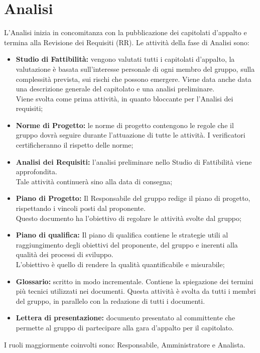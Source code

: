 \section{Analisi}
L'Analisi inizia in concomitanza con la pubblicazione dei capitolati d’appalto e termina alla Revisione dei Requisiti (RR).
Le attività della fase di Analisi sono:
\begin{itemize}
    \item \textbf{Studio di Fattibilità:} vengono valutati tutti i capitolati d'appalto, la valutazione è basata sull'interesse personale di ogni membro del gruppo, sulla complessità prevista, sui rischi che possono emergere. Viene data anche data una descrizione generale del capitolato e una analisi preliminare.\\Viene svolta come prima attività, in quanto bloccante per l'Analisi dei requisiti;
    \item \textbf{Norme di Progetto:} le norme di progetto contengono le regole che il gruppo dovrà seguire durante l'attuazione di tutte le attività. I verificatori certificheranno il rispetto delle norme;
    \item \textbf{Analisi dei Requisiti:} l'analisi preliminare nello Studio di Fattibilità viene approfondita.\\Tale attività continuerà sino alla data di consegna;
    \item \textbf{Piano di Progetto:} Il Responsabile del gruppo redige il piano di progetto, rispettando i vincoli posti dal proponente.\\Questo documento ha l'obiettivo di regolare le attività svolte dal gruppo;
    \item \textbf{Piano di qualifica:} Il piano di qualifica contiene le strategie utili al raggiungimento degli obiettivi del proponente, del gruppo e inerenti alla qualità dei processi di sviluppo.\\L'obiettivo è quello di rendere la qualità quantificabile e misurabile;
    \item \textbf{Glossario:} scritto in modo incrementale. Contiene la spiegazione dei termini più tecnici utilizzati nei documenti. Questa attività è svolta da tutti i membri del gruppo, in parallelo con la redazione di tutti i documenti.
    \item \textbf{Lettera di presentazione:} documento presentato al committente che permette al gruppo di partecipare alla gara d’appalto per il capitolato.
\end{itemize}
I ruoli maggiormente coinvolti sono: Responsabile, Amministratore e Analista.
